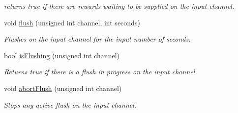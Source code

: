 \begin{DoxyCompactItemize}
\begin{DoxyCompactList}\small\item\em returns true if there are rewards waiting to be supplied on the input channel. \end{DoxyCompactList}\item 
\hypertarget{class_picto_1_1_reward_controller_a82c6d50f2c4d7b924691090e7f8d4781}{void \hyperlink{class_picto_1_1_reward_controller_a82c6d50f2c4d7b924691090e7f8d4781}{flush} (unsigned int channel, int seconds)}\label{class_picto_1_1_reward_controller_a82c6d50f2c4d7b924691090e7f8d4781}

\begin{DoxyCompactList}\small\item\em Flushes on the input channel for the input number of seconds. \end{DoxyCompactList}\item 
\hypertarget{class_picto_1_1_reward_controller_ae54c91a54e1997254bdff6ecedab69bc}{bool \hyperlink{class_picto_1_1_reward_controller_ae54c91a54e1997254bdff6ecedab69bc}{is\-Flushing} (unsigned int channel)}\label{class_picto_1_1_reward_controller_ae54c91a54e1997254bdff6ecedab69bc}

\begin{DoxyCompactList}\small\item\em Returns true if there is a flush in progress on the input channel. \end{DoxyCompactList}\item 
\hypertarget{class_picto_1_1_reward_controller_a5a2d6ef0210c0699afb60bbcc3422f80}{void \hyperlink{class_picto_1_1_reward_controller_a5a2d6ef0210c0699afb60bbcc3422f80}{abort\-Flush} (unsigned int channel)}\label{class_picto_1_1_reward_controller_a5a2d6ef0210c0699afb60bbcc3422f80}

\begin{DoxyCompactList}\small\item\em Stops any active flush on the input channel. \end{DoxyCompactList}\end{DoxyCompactItemize}
